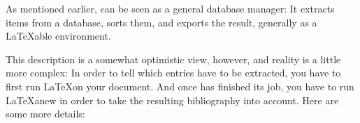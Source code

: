 %
% 
% 


\parttoc
\mtcskip

 \label{bibtex}

As mentioned earlier, \bt can be seen as a general database manager:
It extracts items from a database, sorts them, and exports the 
result, generally as a \LaTeX{}able  
environment. 

This description is a somewhat optimistic view, however, and reality
is a little more complex: In order to tell \bt which entries have to
be extracted, you have to first run \LaTeX on your document. And once
\bt has finished its job, you have to run \LaTeX anew in order to take
the resulting bibliography into account. Here are some more details:


